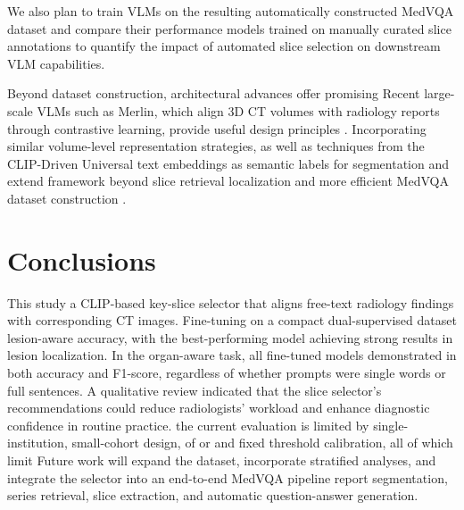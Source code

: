 \documentclass[bioengineering,article,submit,pdftex,moreauthors]{Definitions/mdpi}
\begin{document}
  We also plan to train VLMs on the resulting automatically constructed MedVQA dataset and compare their performance models trained on manually curated slice annotations to quantify the impact of automated slice selection on downstream VLM capabilities.



  Beyond dataset construction, architectural advances offer promising  
  Recent large-scale VLMs such as Merlin, which align 3D CT volumes with radiology reports through contrastive learning, provide useful design principles \cite{blankemeier_merlin_2024}. 
  Incorporating similar volume-level representation strategies, as well as techniques from the CLIP-Driven Universal   text embeddings as semantic labels for segmentation and  extend  framework beyond slice retrieval   localization and more efficient MedVQA dataset construction \cite{10376801}.


\section{Conclusions}

This study  a CLIP-based key-slice selector that aligns free-text radiology findings with  corresponding CT images. Fine-tuning on a compact dual-supervised dataset   lesion-aware accuracy, with the best-performing model achieving strong results in lesion localization. In the organ-aware task, all fine-tuned models demonstrated  in both accuracy and F1-score, regardless of whether prompts were single words or full sentences. A qualitative review indicated that the slice selector’s recommendations could reduce radiologists’ workload and enhance diagnostic confidence in routine practice.  the current evaluation is limited by  single-institution, small-cohort design,  of  or   and   fixed threshold calibration, all of which limit  Future work will expand the dataset, incorporate stratified analyses, and integrate the selector into an end-to-end MedVQA pipeline  report segmentation, series retrieval, slice extraction, and automatic question-answer generation.
\end{document}
